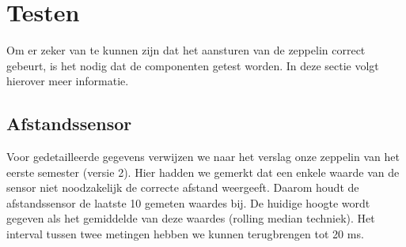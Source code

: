 \documentclass[tt]{penoverslag}
\begin{document}
\section{Testen}

Om er zeker van te kunnen zijn dat het aansturen van de zeppelin correct gebeurt, is het nodig dat de componenten getest worden. In deze sectie volgt hierover meer informatie.

\subsection{Afstandssensor}
Voor gedetailleerde gegevens verwijzen we naar het verslag onze zeppelin van het eerste semester (versie 2). Hier hadden we gemerkt dat een enkele waarde van de sensor niet noodzakelijk de correcte afstand weergeeft. Daarom houdt de afstandssensor de laatste 10 gemeten waardes bij. De huidige hoogte wordt gegeven als het gemiddelde van deze waardes (rolling median techniek). Het interval tussen twee metingen hebben we kunnen terugbrengen tot 20 ms.
\end{document}
